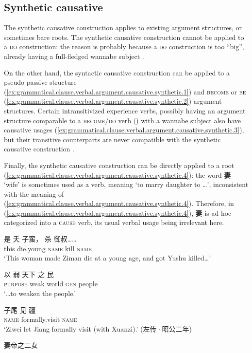 \documentclass[UTF8, a4paper, oneside, scheme=plain, 12pt]{ctexrep}
\newcommand*{\citepage}[1]{p.~{#1}}
\newcommand{\translate}[1]{`#1'}
\newcommand*{\category}[1]{\textsc{#1}}
\begin{document}
\subsection{Synthetic causative}\label{sec:grammatical.clause.verbal.argument-structure.causative.synthetic}

The synthetic causative construction applies to existing argument structures, or sometimes bare roots.
The synthetic causative construction cannot be applied to a \category{do} construction:
the reason is probably because a \category{do} construction is too ``big'',
already having a full-fledged wannabe subject \citep[\citepage{363-364}]{meiguang2018}.

On the other hand, the syntactic causative construction can be applied to 
a pseudo-passive structure (\ref{ex:grammatical.clause.verbal.argument.causative.synthetic.1})
and \category{become} or \category{be} (\ref{ex:grammatical.clause.verbal.argument.causative.synthetic.2}) argument structures.
Certain intransitivized experience verbs,
possibly having an argument structure comparable to a \category{become}/\category{do} verb () with a wannabe subject also have causative usages
(\ref{ex:grammatical.clause.verbal.argument.causative.synthetic.3}),
but their transitive counterparts are never compatible with the synthetic causative construction
\citep[\citepage{274}]{meiguang2018}.

Finally, the synthetic causative construction can be directly applied to a root (\ref{ex:grammatical.clause.verbal.argument.causative.synthetic.4}):
the word 妻 \translate{wife} is sometimes used as a verb,
meaning \translate{to marry daughter to \dots},
inconsistent with the meaning of (\ref{ex:grammatical.clause.verbal.argument.causative.synthetic.4}).
Therefore, in (\ref{ex:grammatical.clause.verbal.argument.causative.synthetic.4}),
妻 is ad hoc categorized into a \category{cause} verb,
its usual verbal usage being irrelevant here.

\begin{exe}
    \ex\label{ex:grammatical.clause.verbal.argument.causative.synthetic.1}
    \gll 是 夭 子蛮， 杀 御叔…… \\
    this die.young \category{name} kill \category{name} \\
    \glt\translate{This woman made Ziman die at a young age, and got Yushu killed\dots}
    
    \ex\label{ex:grammatical.clause.verbal.argument.causative.synthetic.2}
    \gll 以 弱 天下 之 民 \\
    \category{purpose} weak world \category{gen} people \\
    \glt\translate{\dots to weaken the people.}

    \ex\label{ex:grammatical.clause.verbal.argument.causative.synthetic.3}
    \gll 子尾 见 疆 \\
    \category{name} formally.visit \category{name} \\
    \glt\translate{Ziwei let Jiang formally visit (with Xuanzi).} (左传·昭公二年)

    \ex\label{ex:grammatical.clause.verbal.argument.causative.synthetic.4} 妻帝之二女
\end{exe}
\end{document}
